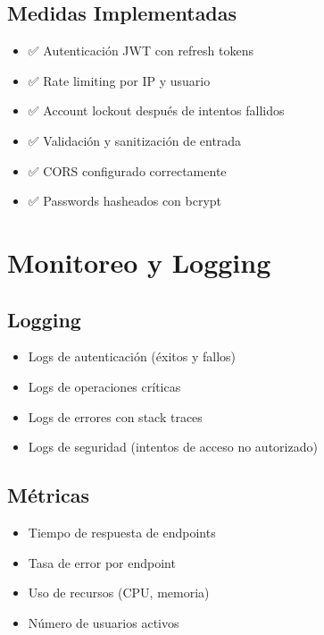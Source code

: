 \documentclass[
  spanish,
  11pt,
  letterpaper,
]{book}
\providecommand{\tightlist}{%
  \setlength{\itemsep}{0pt}\setlength{\parskip}{0pt}}
\begin{document}
\subsection{Medidas Implementadas}\label{medidas-implementadas}

\begin{itemize}
\tightlist
\item
  ✅ Autenticación JWT con refresh tokens
\item
  ✅ Rate limiting por IP y usuario
\item
  ✅ Account lockout después de intentos fallidos
\item
  ✅ Validación y sanitización de entrada
\item
  ✅ CORS configurado correctamente
\item
  ✅ Passwords hasheados con bcrypt
\end{itemize}

\section{Monitoreo y Logging}\label{monitoreo-y-logging}

\subsection{Logging}\label{logging}

\begin{itemize}
\tightlist
\item
  Logs de autenticación (éxitos y fallos)
\item
  Logs de operaciones críticas
\item
  Logs de errores con stack traces
\item
  Logs de seguridad (intentos de acceso no autorizado)
\end{itemize}

\subsection{Métricas}\label{muxe9tricas}

\begin{itemize}
\tightlist
\item
  Tiempo de respuesta de endpoints
\item
  Tasa de error por endpoint
\item
  Uso de recursos (CPU, memoria)
\item
  Número de usuarios activos
\end{itemize}
\end{document}
